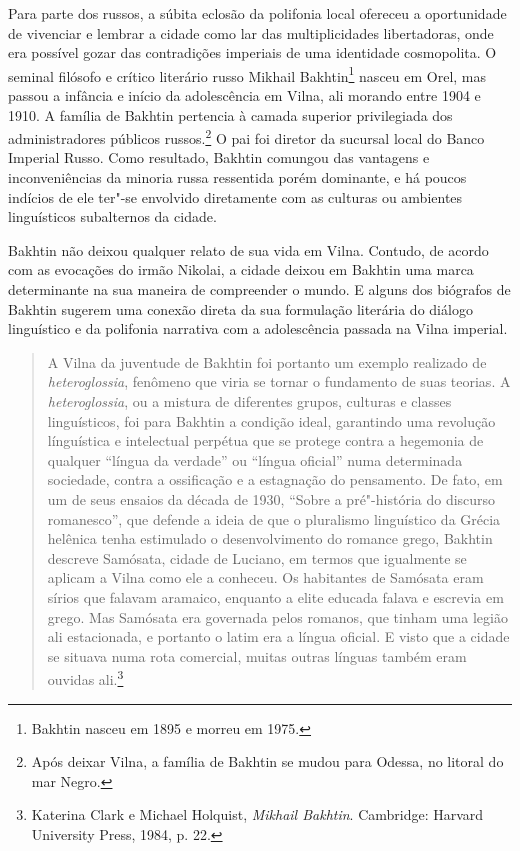 Para parte dos russos, a súbita eclosão da polifonia local ofereceu a
oportunidade de vivenciar e lembrar a cidade como lar das
multiplicidades libertadoras, onde era possível gozar das contradições
imperiais de uma identidade cosmopolita. O seminal filósofo e crítico
literário russo Mikhail Bakhtin\footnote{Bakhtin nasceu em 1895 e morreu em 1975.} nasceu em Orel, mas passou a
infância e início da adolescência em Vilna, ali morando entre 1904 e
1910. A família de Bakhtin pertencia à camada superior privilegiada dos
administradores públicos russos.\footnote{Após deixar Vilna, a família de Bakhtin se mudou
para Odessa, no litoral do mar Negro.} O pai foi diretor da sucursal
local do Banco Imperial Russo. Como resultado, Bakhtin comungou das
vantagens e inconveniências da minoria russa ressentida porém
dominante, e há poucos indícios de ele ter"-se envolvido diretamente com
as culturas ou ambientes linguísticos subalternos da cidade.

Bakhtin não deixou qualquer relato de sua vida em Vilna. Contudo, de
acordo com as evocações do irmão Nikolai, a cidade deixou em Bakhtin uma
marca determinante na sua maneira de compreender o mundo. E alguns dos
biógrafos de Bakhtin sugerem uma conexão direta da sua formulação
literária do diálogo linguístico e da polifonia narrativa com a
adolescência passada na Vilna imperial.

\begin{quote}
A Vilna da juventude de Bakhtin foi portanto um exemplo realizado de
\textit{heteroglossia}, fenômeno que viria se tornar o fundamento de suas
teorias. A \textit{heteroglossia}, ou a mistura de diferentes grupos, culturas e
classes linguísticos, foi para Bakhtin a condição ideal, garantindo uma
revolução línguística e intelectual perpétua que se protege contra a
hegemonia de qualquer ``língua da verdade'' ou ``língua oficial'' numa
determinada sociedade, contra a ossificação e a estagnação do
pensamento. De fato, em um de seus ensaios da década de 1930, ``Sobre a
pré"-história do discurso romanesco'', que defende a ideia de que o
pluralismo linguístico da Grécia helênica tenha estimulado o
desenvolvimento do romance grego, Bakhtin descreve Samósata, cidade de
Luciano, em termos que igualmente se aplicam a Vilna como ele a
conheceu. Os habitantes de Samósata eram sírios que falavam aramaico,
enquanto a elite educada falava e escrevia em grego. Mas Samósata era
governada pelos romanos, que tinham uma legião ali estacionada, e
portanto o latim era a língua oficial. E visto que a cidade se situava
numa rota comercial, muitas outras línguas também eram ouvidas
ali.\footnote{Katerina Clark e Michael Holquist, \textit{Mikhail Bakhtin}. Cambridge: Harvard University Press, 1984, p. 22.} 
\end{quote}

